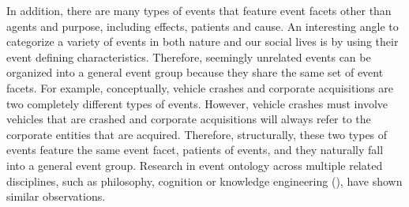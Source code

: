 In addition, there are many types of events that feature event facets 
other than agents and purpose, including effects, patients and cause. 
An interesting angle to categorize a variety of events in both 
nature and our social lives is by using their event defining characteristics. 
Therefore, seemingly unrelated events can be organized into a general event group 
because they share the same set of event facets.  
For example, conceptually, vehicle crashes and corporate acquisitions are two 
completely different types of events. 
However, vehicle crashes must involve vehicles that are crashed 
and corporate acquisitions will always refer to the corporate entities 
that are acquired. Therefore, structurally, these two types of events 
feature the same event facet, patients of events, and they 
naturally fall into a general event group. 
Research in event ontology across multiple related disciplines, 
such as philosophy, cognition or knowledge engineering (\cite{grenon04,Worboys04,Kaneiwa07}), 
have shown similar observations. 

